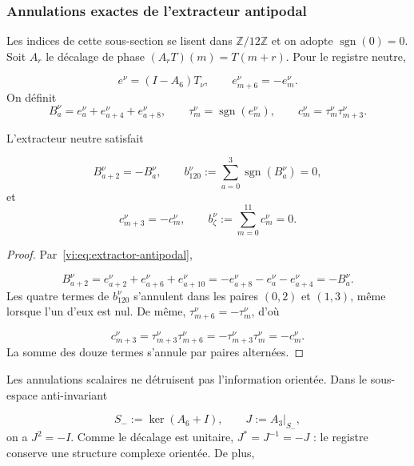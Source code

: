 \subsubsection{Annulations exactes de l’extracteur antipodal
}
\label{vi:subsubsec:cancelaciones-antipodales}

Les indices de cette sous-section se lisent dans \(\mathbb Z/12\mathbb Z\) et
on adopte \(\operatorname{sgn}(0)=0\). Soit \(A_r\) le décalage de
phase \((A_rT)(m)=T(m+r)\). Pour le registre neutre,

\begin{equation}
 e^\nu=(I-A_6)T_\nu,
 \qquad e^\nu_{m+6}=-e^\nu_m.
 \label{vi:eq:extractor-antipodal}
\end{equation}
On définit
\[
 B_a^\nu=e_a^\nu+e_{a+4}^\nu+e_{a+8}^\nu,
 \qquad
 \tau_m^\nu=\operatorname{sgn}(e_m^\nu),
 \qquad
 c_m^\nu=\tau_m^\nu\tau_{m+3}^\nu.
\]

\begin{proposition}
\label{vi:prop:cancelaciones-antipodales}
L’extracteur neutre satisfait

\begin{equation}
 B_{a+2}^\nu=-B_a^\nu,\qquad
 b_{120}^\nu:=\sum_{a=0}^{3}\operatorname{sgn}(B_a^\nu)=0,
 \label{vi:eq:cancelacion-b120}
\end{equation}
et
\begin{equation}
 c_{m+3}^\nu=-c_m^\nu,\qquad
 b_\zeta^\nu:=\sum_{m=0}^{11}c_m^\nu=0.
 \label{vi:eq:cancelacion-bzeta}
\end{equation}
\end{proposition}

\begin{proof}
Par~\eqref{vi:eq:extractor-antipodal},

\[
 B_{a+2}^\nu
 =e_{a+2}^\nu+e_{a+6}^\nu+e_{a+10}^\nu
 =-e_{a+8}^\nu-e_a^\nu-e_{a+4}^\nu=-B_a^\nu.
\]
Les quatre termes de \(b_{120}^\nu\) s’annulent dans les paires
\((0,2)\) et \((1,3)\), même lorsque l’un d’eux est nul. De même,
\(\tau_{m+6}^\nu=-\tau_m^\nu\), d’où

\[
 c_{m+3}^\nu
 =\tau_{m+3}^\nu\tau_{m+6}^\nu
 =-\tau_{m+3}^\nu\tau_m^\nu=-c_m^\nu.
\]
La somme des douze termes s’annule par paires alternées.

\end{proof}

Les annulations scalaires ne détruisent pas l’information orientée. Dans le
sous-espace anti-invariant

\[
 S_-:=\ker(A_6+I),
 \qquad J:=A_3\big|_{S_-},
\]
on a \(J^2=-I\). Comme le décalage est unitaire,
\(J^*=J^{-1}=-J\) : le registre conserve une structure complexe orientée.
De plus,

